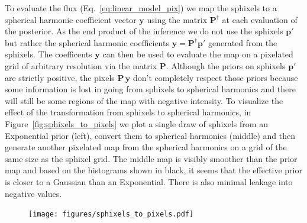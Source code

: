 \documentclass[modern]{aastex62}
\begin{document}
To evaluate the flux (Eq.~\ref{eq:linear_model_pix}) we map the sphixels to a spherical harmonic coefficient vector $\mathbf{y}$ using the matrix $\mathbf{P}^\dagger$ at each evaluation of the posterior.
As the end product of the inference we do not use the sphixels $\mathbf{p}'$ but rather the spherical harmonic coefficients $\mathbf{y}=\mathbf{P}^\dagger\mathbf{p}'$ generated from the sphixels.
The coefficents $\mathbf{y}$ can then be used to evaluate the map on a pixelated grid of arbitrary resolution via the matrix $\mathbf{P}$. 
Although the priors on sphixels $\mathbf{p}'$ are strictly positive, the pixels $\mathbf{P}\,\mathbf{y}$ don't completely respect those priors because some information is lost in going from sphixels to spherical harmonics  and there will still be some regions of the map with negative intensity.
To visualize the effect of the transformation from sphixels to spherical harmonics, in Figure~\ref{fig:sphixels_to_pixels} we plot a single draw of sphixels from an Exponential prior (left), convert them to spherical harmonics (middle) and then generate another pixelated map from the spherical harmonics on a grid of the same size as the sphixel grid.
The middle map is visibly smoother than the prior map and based on the histograms shown in black, it seems that the effective prior is closer to a Gaussian than an Exponential.
There is also minimal leakage into negative values.

\begin{figure}[h!]
    \begin{centering}
    \texttt{[image: figures/sphixels\_to\_pixels.pdf]}
    \end{centering}
\end{figure}
\end{document}
